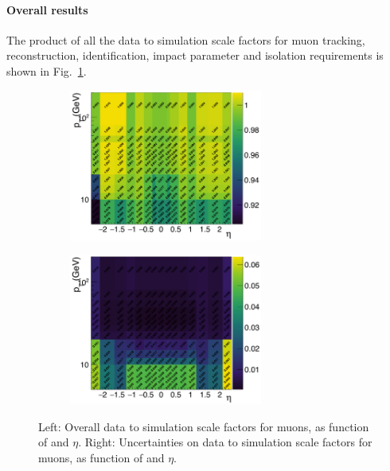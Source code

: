 \paragraph*{Overall results}
The product of all the data to simulation scale factors for muon tracking, reconstruction, identification, impact parameter and isolation requirements is shown in Fig.~\ref{fig:MuonIDEff_5}. 

\begin{figure}[tbh]
\centering
\begin{subfigure}{0.45\textwidth}
\centering
\includegraphics[width=2.5in]{Figures/Muons/mu_sf.pdf}
\caption{}
\end{subfigure}
\begin{subfigure}{0.45\textwidth}
\centering
\includegraphics[width=2.5in]{Figures/Muons/mu_sf_unc.pdf}
\caption{}
\end{subfigure}
    \caption{Left: Overall data to simulation scale factors for muons, as function of \pt and $\eta$. Right: Uncertainties on  data to simulation scale factors for muons, as function of \pt and $\eta$.}
    \label{fig:MuonIDEff_5}
\end{figure}



